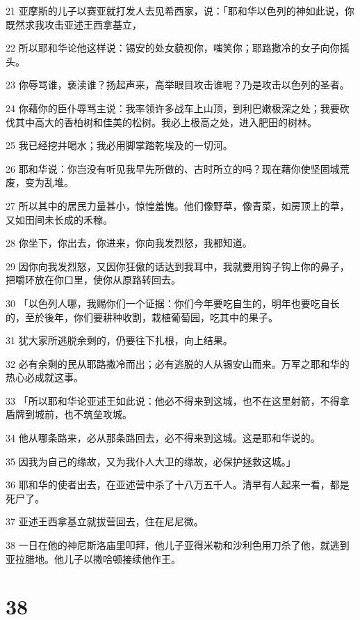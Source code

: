 \par 21 亚摩斯的儿子以赛亚就打发人去见希西家，说：「耶和华以色列的神如此说，你既然求我攻击亚述王西拿基立，
\par 22 所以耶和华论他这样说：锡安的处女藐视你，嗤笑你；耶路撒冷的女子向你摇头。
\par 23 你辱骂谁，亵渎谁？扬起声来，高举眼目攻击谁呢？乃是攻击以色列的圣者。
\par 24 你藉你的臣仆辱骂主说：我率领许多战车上山顶，到利巴嫩极深之处；我要砍伐其中高大的香柏树和佳美的松树。我必上极高之处，进入肥田的树林。
\par 25 我已经挖井喝水；我必用脚掌踏乾埃及的一切河。
\par 26 耶和华说：你岂没有听见我早先所做的、古时所立的吗？现在藉你使坚固城荒废，变为乱堆。
\par 27 所以其中的居民力量甚小，惊惶羞愧。他们像野草，像青菜，如房顶上的草，又如田间未长成的禾稼。
\par 28 你坐下，你出去，你进来，你向我发烈怒，我都知道。
\par 29 因你向我发烈怒，又因你狂傲的话达到我耳中，我就要用钩子钩上你的鼻子，把嚼环放在你口里，使你从原路转回去。
\par 30 「以色列人哪，我赐你们一个证据：你们今年要吃自生的，明年也要吃自长的，至於後年，你们要耕种收割，栽植葡萄园，吃其中的果子。
\par 31 犹大家所逃脱余剩的，仍要往下扎根，向上结果。
\par 32 必有余剩的民从耶路撒冷而出；必有逃脱的人从锡安山而来。万军之耶和华的热心必成就这事。
\par 33 「所以耶和华论亚述王如此说：他必不得来到这城，也不在这里射箭，不得拿盾牌到城前，也不筑垒攻城。
\par 34 他从哪条路来，必从那条路回去，必不得来到这城。这是耶和华说的。
\par 35 因我为自己的缘故，又为我仆人大卫的缘故，必保护拯救这城。」
\par 36 耶和华的使者出去，在亚述营中杀了十八万五千人。清早有人起来一看，都是死尸了。
\par 37 亚述王西拿基立就拔营回去，住在尼尼微。
\par 38 一日在他的神尼斯洛庙里叩拜，他儿子亚得米勒和沙利色用刀杀了他，就逃到亚拉腊地。他儿子以撒哈顿接续他作王。

\chapter{38}


